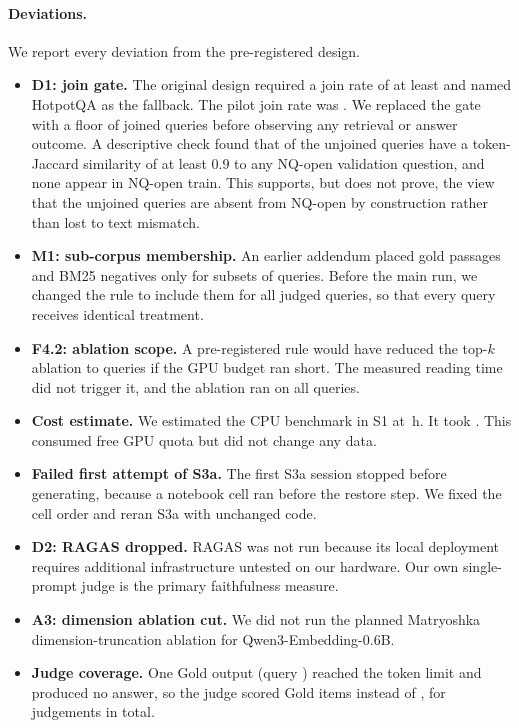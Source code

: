 \paragraph{Deviations.} We report every deviation from the pre-registered design.
\begin{itemize}
\item \textbf{D1: join gate.} The original design required a join rate of at least  and named HotpotQA as the fallback. The pilot join rate was . We replaced the gate with a floor of  joined queries before observing any retrieval or answer outcome. A descriptive check found that  of the  unjoined queries have a token-Jaccard similarity of at least 0.9 to any NQ-open validation question, and none appear in NQ-open train. This supports, but does not prove, the view that the unjoined queries are absent from NQ-open by construction rather than lost to text mismatch.
\item \textbf{M1: sub-corpus membership.} An earlier addendum placed gold passages and BM25 negatives only for subsets of queries. Before the main run, we changed the rule to include them for all  judged queries, so that every query receives identical treatment.
\item \textbf{F4.2: ablation scope.} A pre-registered rule would have reduced the top-$k$ ablation to  queries if the GPU budget ran short. The measured reading time did not trigger it, and the ablation ran on all  queries.
\item \textbf{Cost estimate.} We estimated the CPU benchmark in S1 at \,h. It took . This consumed free GPU quota but did not change any data.
\item \textbf{Failed first attempt of S3a.} The first S3a session stopped before generating, because a notebook cell ran before the restore step. We fixed the cell order and reran S3a with unchanged code.
\item \textbf{D2: RAGAS dropped.} RAGAS was not run because its local deployment requires additional infrastructure untested on our hardware. Our own single-prompt judge is the primary faithfulness measure.
\item \textbf{A3: dimension ablation cut.} We did not run the planned Matryoshka dimension-truncation ablation for Qwen3-Embedding-0.6B.
\item \textbf{Judge coverage.} One Gold output (query \texttt{}) reached the token limit and produced no answer, so the judge scored  Gold items instead of , for  judgements in total.

\end{itemize}
